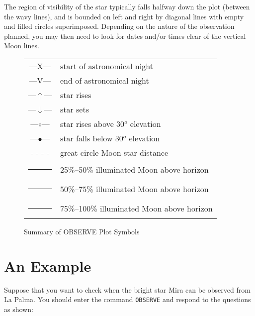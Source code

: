 The region of visibility of the star typically falls halfway down the plot
(between the wavy lines), and is bounded on left and right by diagonal lines
with empty and filled  circles superimposed. Depending on the nature of the
observation planned, you may then need  to look for  dates and/or times clear
of the vertical Moon lines.

\begin{figure}\caption{Summary of OBSERVE Plot Symbols}
\label{fig:sum}
\begin{center}
\begin{tabular}{|c|l|}
\hline
\large
---{\sf X}--- & start of astronomical night \\
---{\sf V}--- & end of astronomical night \\
---$\uparrow$--- & star rises \\
---$\downarrow$--- & star sets \\
---$\circ$--- & star rises above 30$^o$ elevation\\
---$\bullet$--- & star falls below 30$^o$ elevation\\
- - - - & great circle Moon-star distance \\
\rule{0.1mm}{4mm} & 25\%--50\% illuminated Moon above horizon\\
\rule{0.3mm}{4mm} & 50\%--75\% illuminated Moon above horizon\\
\rule{0.5mm}{4mm} & 75\%--100\% illuminated Moon above horizon\\
\hline
\end{tabular}
\end{center}
\end{figure}

\newpage
\section{An Example}

Suppose that you want to check when the bright star Mira can be observed  from
La Palma.  You should enter the command {\tt OBSERVE} and respond to the
questions as  shown:

